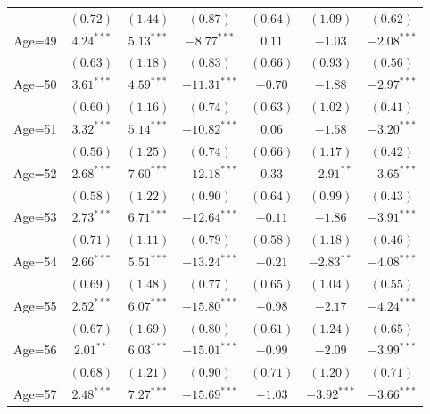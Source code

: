 \documentclass[fullpage]{paper}
\begin{document}
\begin{center}
\begin{longtable}{l c c c c c c }
            & $(0.72)$      & $(1.44)$      & $(0.87)$       & $(0.64)$      & $(1.09)$      & $(0.62)$      \\
Age=49      & $4.24^{***}$  & $5.13^{***}$  & $-8.77^{***}$  & $0.11$        & $-1.03$       & $-2.08^{***}$ \\
            & $(0.63)$      & $(1.18)$      & $(0.83)$       & $(0.66)$      & $(0.93)$      & $(0.56)$      \\
Age=50      & $3.61^{***}$  & $4.59^{***}$  & $-11.31^{***}$ & $-0.70$       & $-1.88$       & $-2.97^{***}$ \\
            & $(0.60)$      & $(1.16)$      & $(0.74)$       & $(0.63)$      & $(1.02)$      & $(0.41)$      \\
Age=51      & $3.32^{***}$  & $5.14^{***}$  & $-10.82^{***}$ & $0.06$        & $-1.58$       & $-3.20^{***}$ \\
            & $(0.56)$      & $(1.25)$      & $(0.74)$       & $(0.66)$      & $(1.17)$      & $(0.42)$      \\
Age=52      & $2.68^{***}$  & $7.60^{***}$  & $-12.18^{***}$ & $0.33$        & $-2.91^{**}$  & $-3.65^{***}$ \\
            & $(0.58)$      & $(1.22)$      & $(0.90)$       & $(0.64)$      & $(0.99)$      & $(0.43)$      \\
Age=53      & $2.73^{***}$  & $6.71^{***}$  & $-12.64^{***}$ & $-0.11$       & $-1.86$       & $-3.91^{***}$ \\
            & $(0.71)$      & $(1.11)$      & $(0.79)$       & $(0.58)$      & $(1.18)$      & $(0.46)$      \\
Age=54      & $2.66^{***}$  & $5.51^{***}$  & $-13.24^{***}$ & $-0.21$       & $-2.83^{**}$  & $-4.08^{***}$ \\
            & $(0.69)$      & $(1.48)$      & $(0.77)$       & $(0.65)$      & $(1.04)$      & $(0.55)$      \\
Age=55      & $2.52^{***}$  & $6.07^{***}$  & $-15.80^{***}$ & $-0.98$       & $-2.17$       & $-4.24^{***}$ \\
            & $(0.67)$      & $(1.69)$      & $(0.80)$       & $(0.61)$      & $(1.24)$      & $(0.65)$      \\
Age=56      & $2.01^{**}$   & $6.03^{***}$  & $-15.01^{***}$ & $-0.99$       & $-2.09$       & $-3.99^{***}$ \\
            & $(0.68)$      & $(1.21)$      & $(0.90)$       & $(0.71)$      & $(1.20)$      & $(0.71)$      \\
Age=57      & $2.48^{***}$  & $7.27^{***}$  & $-15.69^{***}$ & $-1.03$       & $-3.92^{***}$ & $-3.66^{***}$ \\

\end{longtable}
\end{center}
\end{document}
